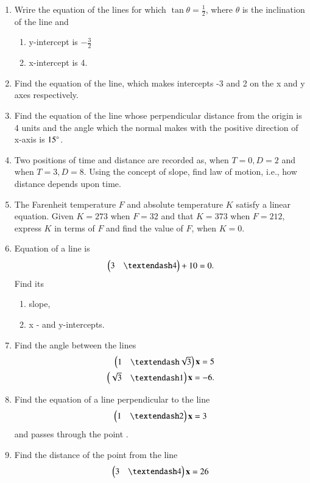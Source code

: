 \begin{enumerate}[label=\arabic*.,ref=\thesubsection.\theenumi]
\item Wrire the equation of the lines for which $\tan \theta = \frac{1}{2}$, where $\theta$ is the inclination of the line and 
\begin{enumerate}
\item y-intercept is $-\frac{3}{2}$
\item x-intercept is 4.
\end{enumerate}
\item Find the equation of the line, which makes intercepts -3 and 2 on the x and y axes respectively.
\item Find the equation of the line whose perpendicular distance from the origin is 4 units and the angle which the normal makes with the positive direction of x-axis is $15\degree$.
\item Two positions of time and distance are recorded as, when $T = 0, D = 2$ and when $T = 3, D = 8$. Using the concept of slope, find law of motion, i.e., how distance depends upon time.
\item The Farenheit temperature $F$ and absolute temperature $K$ satisfy a linear equation.  Given $K=273$ when $F=32$ and that $K=373$  when $F=212$, express $K$ in terms of $F$ and find the value of $F$, when $K=0$.
\item Equation of a line is 
\begin{align}
\myvec{3 & – 4} + 10 = 0. 
\end{align}
Find its 
\begin{enumerate}
\item  slope, 
\item  x - and y-intercepts.
\end{enumerate}
\item Find the angle between the lines 
\begin{align}
\myvec{1 & – \sqrt{3}}\vec{x}  = 5
\\
\myvec{\sqrt{3} & –1}\vec{x}  = -6
. 
\end{align}
\item Find the equation of a line perpendicular to the line 
\begin{align}
\myvec{1 & – 2}\vec{x}  = 3
\end{align}
%
and passes through the point .
\item Find the distance of the point  from the line 
\begin{align}
\myvec{3 & – 4}\vec{x}  = 26
\end{align}

\end{enumerate}
